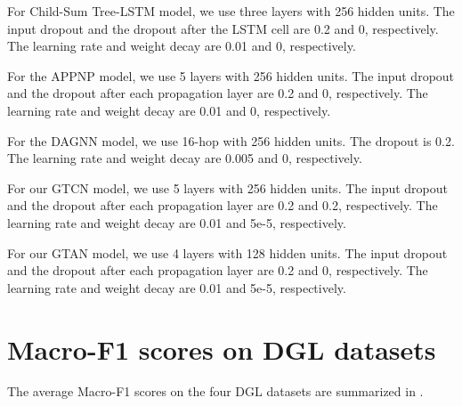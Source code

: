 \documentclass[lettersize,journal]{IEEEtran}
\theoremstyle{plain}
\theoremstyle{definition}
\theoremstyle{remark}
\begin{document}
For Child-Sum Tree-LSTM model, we use three layers with 256 hidden units. The input dropout and the dropout after the LSTM cell are 0.2 and 0, respectively. The learning rate and weight decay are 0.01 and 0, respectively. 

For the APPNP model, we use 5 layers with 256 hidden units. The input dropout and the dropout after each propagation layer are 0.2 and 0, respectively. The learning rate and weight decay are 0.01 and 0, respectively. 

For the DAGNN model, we use 16-hop with 256 hidden units. The dropout is 0.2. The learning rate and weight decay are 0.005 and 0, respectively. 

For our GTCN model, we use 5 layers with 256 hidden units. The input dropout and the dropout after each propagation layer are 0.2 and 0.2, respectively. The learning rate and weight decay are 0.01 and 5e-5, respectively.

For our GTAN model, we use 4 layers with 128 hidden units. The input dropout and the dropout after each propagation layer are 0.2 and 0, respectively. The learning rate and weight decay are 0.01 and 5e-5, respectively.

\section{Macro-F1 scores on DGL datasets}
\label{result:F1}
The average Macro-F1 scores on the four DGL datasets are summarized in .








\end{document}
